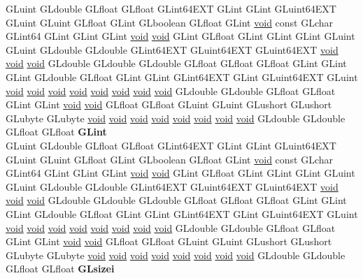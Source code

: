 \begin{DoxyCompactItemize}
\begin{tabbing}
\>GLuint GLdouble GLfloat GLfloat GLint64EXT GLint GLint GLuint64EXT GLuint GLuint GLfloat GLint GLboolean GLfloat GLint \hyperlink{interfacevoid}{void} const GLchar GLint64 GLint GLint GLint \hyperlink{interfacevoid}{void} \hyperlink{interfacevoid}{void} GLint GLfloat GLint GLint GLint GLuint GLuint GLdouble GLdouble GLint64EXT GLuint64EXT GLuint64EXT \hyperlink{interfacevoid}{void} \hyperlink{interfacevoid}{void} \hyperlink{interfacevoid}{void} GLdouble GLdouble GLdouble GLfloat GLfloat GLfloat GLint GLint GLint GLdouble GLfloat GLint GLint GLint64EXT GLint GLuint64EXT GLuint \hyperlink{interfacevoid}{void} \hyperlink{interfacevoid}{void} \hyperlink{interfacevoid}{void} \hyperlink{interfacevoid}{void} \hyperlink{interfacevoid}{void} \hyperlink{interfacevoid}{void} \hyperlink{interfacevoid}{void} \hyperlink{interfacevoid}{void} GLdouble GLdouble GLfloat GLfloat GLint GLint \hyperlink{interfacevoid}{void} \hyperlink{interfacevoid}{void} GLfloat GLfloat GLuint GLuint GLushort GLushort GLubyte GLubyte \hyperlink{interfacevoid}{void} \hyperlink{interfacevoid}{void} \hyperlink{interfacevoid}{void} \hyperlink{interfacevoid}{void} \hyperlink{interfacevoid}{void} \hyperlink{interfacevoid}{void} \hyperlink{interfacevoid}{void} \hyperlink{interfacevoid}{void} GLdouble GLdouble GLfloat GLfloat {\bfseries GLint}\\
\>GLuint GLdouble GLfloat GLfloat GLint64EXT GLint GLint GLuint64EXT GLuint GLuint GLfloat GLint GLboolean GLfloat GLint \hyperlink{interfacevoid}{void} const GLchar GLint64 GLint GLint GLint \hyperlink{interfacevoid}{void} \hyperlink{interfacevoid}{void} GLint GLfloat GLint GLint GLint GLuint GLuint GLdouble GLdouble GLint64EXT GLuint64EXT GLuint64EXT \hyperlink{interfacevoid}{void} \hyperlink{interfacevoid}{void} \hyperlink{interfacevoid}{void} GLdouble GLdouble GLdouble GLfloat GLfloat GLfloat GLint GLint GLint GLdouble GLfloat GLint GLint GLint64EXT GLint GLuint64EXT GLuint \hyperlink{interfacevoid}{void} \hyperlink{interfacevoid}{void} \hyperlink{interfacevoid}{void} \hyperlink{interfacevoid}{void} \hyperlink{interfacevoid}{void} \hyperlink{interfacevoid}{void} \hyperlink{interfacevoid}{void} \hyperlink{interfacevoid}{void} GLdouble GLdouble GLfloat GLfloat GLint GLint \hyperlink{interfacevoid}{void} \hyperlink{interfacevoid}{void} GLfloat GLfloat GLuint GLuint GLushort GLushort GLubyte GLubyte \hyperlink{interfacevoid}{void} \hyperlink{interfacevoid}{void} \hyperlink{interfacevoid}{void} \hyperlink{interfacevoid}{void} \hyperlink{interfacevoid}{void} \hyperlink{interfacevoid}{void} \hyperlink{interfacevoid}{void} \hyperlink{interfacevoid}{void} GLdouble GLdouble GLfloat GLfloat {\bfseries GLsizei}\\

\end{tabbing}
\end{DoxyCompactItemize}
